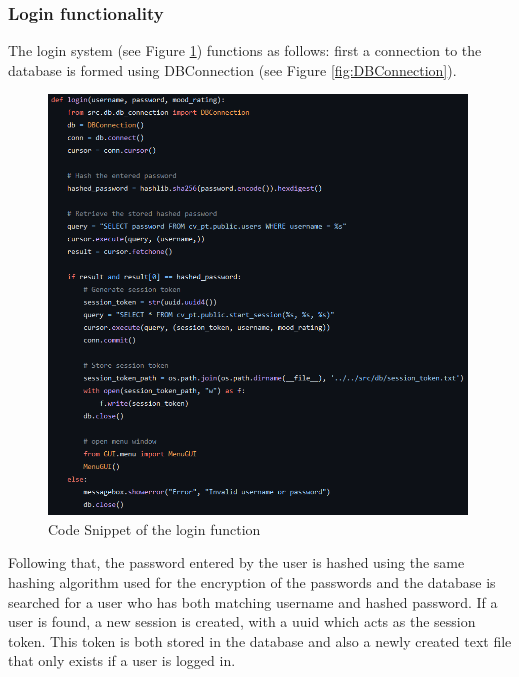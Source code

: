         \subsubsection{Login functionality}
            The login system (see Figure \ref{fig:login_code}) functions as follows: first a connection to the database is formed using DBConnection (see Figure \ref{fig:DBConnection}).
            
            \begin{figure}[htbp]
                    \centering
                    \includegraphics[width=0.99\textwidth]{figures/login_code.png}
                    \caption{Code Snippet of the login function}
                    \label{fig:login_code}
            \end{figure}

            Following that, the password entered by the user is hashed using the same hashing algorithm used for the encryption of the passwords and the database is searched for a user who has both matching username and hashed password. If a user is found, a new session is created, with a uuid which acts as the session token. This token is both stored in the database and also a newly created text file that only exists if a user is logged in.

